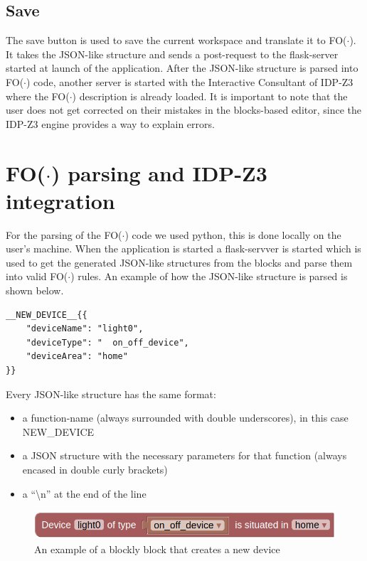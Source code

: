 \documentclass[11pt,a4paper]{report}
\newcommand{\fodot}{FO($\cdot$)\xspace}
\begin{document}
\subsection{Save}
The save button is used to save the current workspace and translate it to \fodot. It takes the JSON-like structure and sends a post-request to the flask-server started at launch of the application. After the JSON-like structure is parsed into \fodot code, another server is started with the Interactive Consultant of IDP-Z3 where the \fodot description is already loaded. It is important to note that the user does not get corrected on their mistakes in the blocks-based editor, since the IDP-Z3 engine provides a way to explain errors.

\section{\fodot parsing and IDP-Z3 integration}
For the parsing of the \fodot code we used python, this is done locally on the user's machine. When the application is started a flask-servver is started which is used to get the generated JSON-like structures from the blocks and parse them into valid \fodot rules.
An example of how the JSON-like structure is parsed is shown below.
\begin{verbatim}
__NEW_DEVICE__{{
    "deviceName": "light0", 
    "deviceType": "  on_off_device", 
    "deviceArea": "home"
}}
\end{verbatim}
Every JSON-like structure has the same format:
\begin{itemize}
    \item a function-name (always surrounded with double underscores), in this case NEW\_DEVICE
    \item a JSON structure with the necessary parameters for that function (always encased in double curly brackets)
    \item a ``\textbackslash n'' at the end of the line
\end{itemize}

\begin{figure}
    \centering
    \includegraphics[width=0.8\linewidth]{images/blockly_new_device.png}
    \caption{An example of a blockly block that creates a new device}
    \label{fig:blockly_new_device}
\end{figure}
\end{document}
